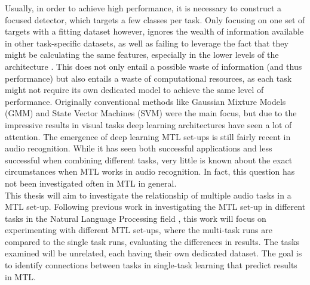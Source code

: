 Usually, in order to achieve high performance, it is necessary to construct a focused detector, which targets a few classes per task. Only focusing on one set of targets with a fitting dataset however, ignores the wealth of information available in other task-specific datasets, as well as failing to leverage the fact that they might be calculating the same features, especially in the lower levels of the architecture \citep{tagliasacchi2020multi}. This does not only entail a possible waste of information (and thus performance) but also entails a waste of computational resources, as each task might not require its own dedicated model to achieve the same level of performance. Originally conventional methods like Gaussian Mixture Models (GMM) and State Vector Machines (SVM) were the main focus, but due to the impressive results in visual tasks deep learning architectures have seen a lot of attention.  The emergence of deep learning MTL set-ups is still fairly recent in audio recognition. While it has seen both successful \citep{tonami2019joint} applications and less successful \citep{sakti2016deep} when combining different tasks, very little is known about the exact circumstances when MTL works in audio recognition. In fact, this question has not been investigated often in MTL in general.\\ 

This thesis will aim to investigate the relationship of multiple audio tasks in a MTL set-up. Following previous work in investigating the MTL set-up in different tasks in the Natural Language Processing field \citep{alonso2016multitask} \citep{bingel2017identifying}, 
this work will focus on experimenting with different MTL set-ups, where the multi-task runs are compared to the single task runs, evaluating the differences in results. The tasks examined will be unrelated, each having their own dedicated dataset. The goal is to identify connections between tasks in single-task learning that predict results in MTL. 